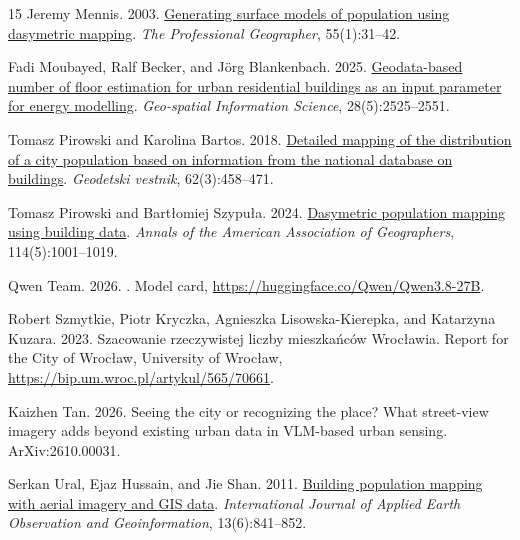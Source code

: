 \documentclass[11pt]{article}
\begin{document}
\begin{thebibliography}{15}
Jeremy Mennis. 2003.
\newblock \href {https://doi.org/10.1111/0033-0124.10042} {Generating surface
  models of population using dasymetric mapping}.
\newblock \emph{The Professional Geographer}, 55(1):31--42.

Fadi Moubayed, Ralf Becker, and J{\"o}rg Blankenbach. 2025.
\newblock \href {https://doi.org/10.1080/10095020.2025.2465307} {Geodata-based
  number of floor estimation for urban residential buildings as an input
  parameter for energy modelling}.
\newblock \emph{Geo-spatial Information Science}, 28(5):2525--2551.

Tomasz Pirowski and Karolina Bartos. 2018.
\newblock \href {https://doi.org/10.15292/geodetski-vestnik.2018.03.458-471}
  {Detailed mapping of the distribution of a city population based on
  information from the national database on buildings}.
\newblock \emph{Geodetski vestnik}, 62(3):458--471.

Tomasz Pirowski and Bart{\l}omiej Szypu{\l}a. 2024.
\newblock \href {https://doi.org/10.1080/24694452.2024.2313500} {Dasymetric
  population mapping using building data}.
\newblock \emph{Annals of the American Association of Geographers},
  114(5):1001--1019.

Qwen Team. 2026.
.
\newblock Model card, \url{https://huggingface.co/Qwen/Qwen3.8-27B}.

Robert Szmytkie, Piotr Kryczka, Agnieszka Lisowska-Kierepka, and Katarzyna Kuzara. 2023.
\newblock Szacowanie rzeczywistej liczby mieszkańców Wrocławia.
\newblock Report for the City of Wrocław, University of Wrocław, \url{https://bip.um.wroc.pl/artykul/565/70661}.

Kaizhen Tan. 2026.
\newblock Seeing the city or recognizing the place? {What} street-view imagery
  adds beyond existing urban data in {VLM}-based urban sensing.
\newblock ArXiv:2610.00031.

Serkan Ural, Ejaz Hussain, and Jie Shan. 2011.
\newblock \href {https://doi.org/10.1016/j.jag.2011.06.004} {Building
  population mapping with aerial imagery and {GIS} data}.
\newblock \emph{International Journal of Applied Earth Observation and
  Geoinformation}, 13(6):841--852.

\end{thebibliography}
\end{document}
